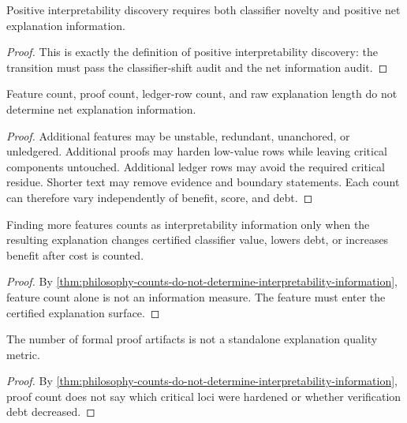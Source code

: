 \begin{theorem}
\label{thm:philosophy-positive-discovery-two-audits}
Positive interpretability discovery requires both classifier novelty and
positive net explanation information.
\end{theorem}
\begin{proof}
This is exactly the definition of positive interpretability discovery:
the transition must pass the classifier-shift audit and the net
information audit.
\end{proof}

\begin{theorem}
\label{thm:philosophy-counts-do-not-determine-interpretability-information}
Feature count, proof count, ledger-row count, and raw explanation length
do not determine net explanation information.
\end{theorem}
\begin{proof}
Additional features may be unstable, redundant, unanchored, or
unledgered. Additional proofs may harden low-value rows while leaving
critical components untouched. Additional ledger rows may avoid the
required critical residue. Shorter text may remove evidence and boundary
statements. Each count can therefore vary independently of benefit,
score, and debt.
\end{proof}

\begin{corollary}
\label{cor:philosophy-feature-discovery-requires-certificate-value}
Finding more features counts as interpretability information only when
the resulting explanation changes certified classifier value, lowers
debt, or increases benefit after cost is counted.
\end{corollary}
\begin{proof}
By \autoref{thm:philosophy-counts-do-not-determine-interpretability-information},
feature count alone is not an information measure. The feature must
enter the certified explanation surface.
\end{proof}

\begin{corollary}
\label{cor:philosophy-proof-quantity-not-explanation-quality}
The number of formal proof artifacts is not a standalone explanation
quality metric.
\end{corollary}
\begin{proof}
By \autoref{thm:philosophy-counts-do-not-determine-interpretability-information},
proof count does not say which critical loci were hardened or whether
verification debt decreased.
\end{proof}

